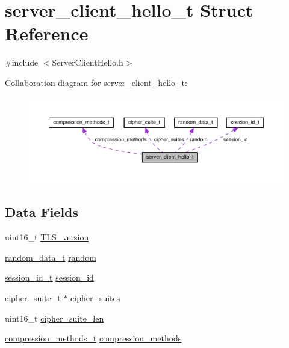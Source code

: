 \hypertarget{structserver__client__hello__t}{}\section{server\+\_\+client\+\_\+hello\+\_\+t Struct Reference}
\label{structserver__client__hello__t}


{\ttfamily \#include $<$Server\+Client\+Hello.\+h$>$}



Collaboration diagram for server\+\_\+client\+\_\+hello\+\_\+t\+:\nopagebreak
\begin{figure}[H]
\begin{center}
\leavevmode
\includegraphics[width=350pt]{structserver__client__hello__t__coll__graph}
\end{center}
\end{figure}
\subsection*{Data Fields}
\begin{DoxyCompactItemize}
\item 
uint16\+\_\+t \hyperlink{structserver__client__hello__t_a5b4305b976c657bb4a056e00aeadb8ef}{T\+L\+S\+\_\+version}
\item 
\hyperlink{structrandom__data__t}{random\+\_\+data\+\_\+t} \hyperlink{structserver__client__hello__t_aefaae3d96978baaa21b9445a5728b4fe}{random}
\item 
\hyperlink{structsession__id__t}{session\+\_\+id\+\_\+t} \hyperlink{structserver__client__hello__t_a74379b0c9faddd3c3481e648a4ba2356}{session\+\_\+id}
\item 
\hyperlink{structcipher__suite__t}{cipher\+\_\+suite\+\_\+t} $\ast$ \hyperlink{structserver__client__hello__t_a545e2b09874bc2250aed603ef61820a6}{cipher\+\_\+suites}
\item 
uint16\+\_\+t \hyperlink{structserver__client__hello__t_a706adb2fc3f8fa8fe9bdd5793f32183e}{cipher\+\_\+suite\+\_\+len}
\item 
\hyperlink{structcompression__methods__t}{compression\+\_\+methods\+\_\+t} \hyperlink{structserver__client__hello__t_a08a470f144044c5ea244590f9ead8165}{compression\+\_\+methods}
\end{DoxyCompactItemize}


